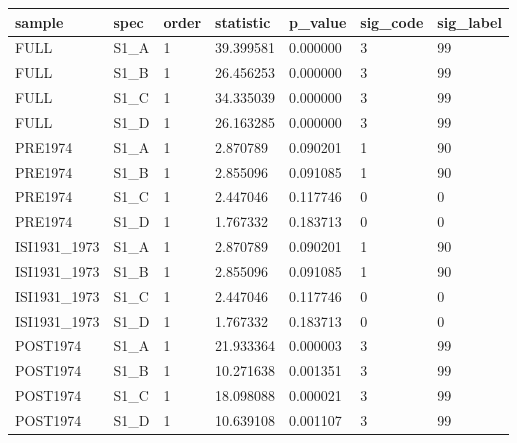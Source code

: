 \begin{tabular}{lllllll}
\hline
sample & spec & order & statistic & p\_value & sig\_code & sig\_label \\
\hline
FULL & S1\_A & 1 & 39.399581 & 0.000000 & 3 & 99 \\
FULL & S1\_B & 1 & 26.456253 & 0.000000 & 3 & 99 \\
FULL & S1\_C & 1 & 34.335039 & 0.000000 & 3 & 99 \\
FULL & S1\_D & 1 & 26.163285 & 0.000000 & 3 & 99 \\
PRE1974 & S1\_A & 1 & 2.870789 & 0.090201 & 1 & 90 \\
PRE1974 & S1\_B & 1 & 2.855096 & 0.091085 & 1 & 90 \\
PRE1974 & S1\_C & 1 & 2.447046 & 0.117746 & 0 & 0 \\
PRE1974 & S1\_D & 1 & 1.767332 & 0.183713 & 0 & 0 \\
ISI1931\_1973 & S1\_A & 1 & 2.870789 & 0.090201 & 1 & 90 \\
ISI1931\_1973 & S1\_B & 1 & 2.855096 & 0.091085 & 1 & 90 \\
ISI1931\_1973 & S1\_C & 1 & 2.447046 & 0.117746 & 0 & 0 \\
ISI1931\_1973 & S1\_D & 1 & 1.767332 & 0.183713 & 0 & 0 \\
POST1974 & S1\_A & 1 & 21.933364 & 0.000003 & 3 & 99 \\
POST1974 & S1\_B & 1 & 10.271638 & 0.001351 & 3 & 99 \\
POST1974 & S1\_C & 1 & 18.098088 & 0.000021 & 3 & 99 \\
POST1974 & S1\_D & 1 & 10.639108 & 0.001107 & 3 & 99 \\
\hline
\end{tabular}
